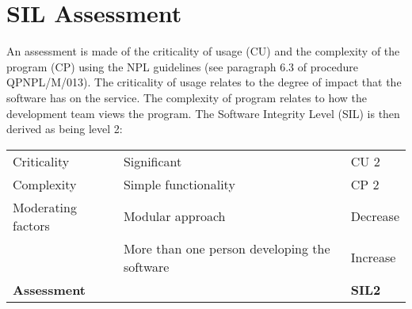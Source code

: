 \section{SIL Assessment}\label{SIL-assessment}
An assessment is made of the criticality of usage (CU) and the complexity of the program (CP) using the NPL guidelines (see paragraph 6.3 of procedure QPNPL/M/013). The criticality of usage relates to the degree of impact that the software has on the service. The complexity of program relates to how the development team views the program. The Software Integrity Level (SIL) is then derived as being level 2: 

\begin{tabular}{lll}
\toprule
Criticality         & Significant              & CU 2  \\
Complexity          & Simple functionality     & CP 2 \\
Moderating factors  & Modular approach         & Decrease \\
                    & More than one person developing the software & Increase \\ \midrule
\textbf{Assessment} &                                              & \textbf{SIL2}  \\ \bottomrule
\end{tabular}